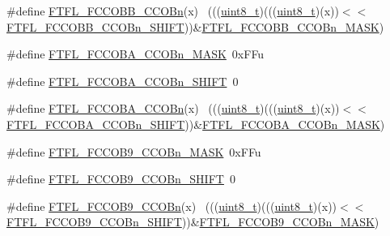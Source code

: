 \begin{DoxyCompactItemize}
\item 
\#define \hyperlink{group___f_t_f_l___register___masks_ga8c8c060a2b2c08932c0e1b086c0c7d60}{F\+T\+F\+L\+\_\+\+F\+C\+C\+O\+B\+B\+\_\+\+C\+C\+O\+Bn}(x)                                      ~(((\hyperlink{_p_e___types_8h_aba7bc1797add20fe3efdf37ced1182c5}{uint8\+\_\+t})(((\hyperlink{_p_e___types_8h_aba7bc1797add20fe3efdf37ced1182c5}{uint8\+\_\+t})(x))$<$$<$\hyperlink{group___f_t_f_l___register___masks_ga067fddda40a93b82c28ccc4ce3a953bd}{F\+T\+F\+L\+\_\+\+F\+C\+C\+O\+B\+B\+\_\+\+C\+C\+O\+Bn\+\_\+\+S\+H\+I\+FT}))\&\hyperlink{group___f_t_f_l___register___masks_ga00aef335772d6ebee4d1e0fbeda40c7d}{F\+T\+F\+L\+\_\+\+F\+C\+C\+O\+B\+B\+\_\+\+C\+C\+O\+Bn\+\_\+\+M\+A\+SK})
\item 
\#define \hyperlink{group___f_t_f_l___register___masks_ga990729a695abb380c9cc804f68ec67b5}{F\+T\+F\+L\+\_\+\+F\+C\+C\+O\+B\+A\+\_\+\+C\+C\+O\+Bn\+\_\+\+M\+A\+SK}~0x\+F\+Fu
\item 
\#define \hyperlink{group___f_t_f_l___register___masks_gaa02cc5a818b780fca7bbfd8755ff6edd}{F\+T\+F\+L\+\_\+\+F\+C\+C\+O\+B\+A\+\_\+\+C\+C\+O\+Bn\+\_\+\+S\+H\+I\+FT}~0
\item 
\#define \hyperlink{group___f_t_f_l___register___masks_ga41d45da82803e80c3faaee17a5a120be}{F\+T\+F\+L\+\_\+\+F\+C\+C\+O\+B\+A\+\_\+\+C\+C\+O\+Bn}(x)                                      ~(((\hyperlink{_p_e___types_8h_aba7bc1797add20fe3efdf37ced1182c5}{uint8\+\_\+t})(((\hyperlink{_p_e___types_8h_aba7bc1797add20fe3efdf37ced1182c5}{uint8\+\_\+t})(x))$<$$<$\hyperlink{group___f_t_f_l___register___masks_gaa02cc5a818b780fca7bbfd8755ff6edd}{F\+T\+F\+L\+\_\+\+F\+C\+C\+O\+B\+A\+\_\+\+C\+C\+O\+Bn\+\_\+\+S\+H\+I\+FT}))\&\hyperlink{group___f_t_f_l___register___masks_ga990729a695abb380c9cc804f68ec67b5}{F\+T\+F\+L\+\_\+\+F\+C\+C\+O\+B\+A\+\_\+\+C\+C\+O\+Bn\+\_\+\+M\+A\+SK})
\item 
\#define \hyperlink{group___f_t_f_l___register___masks_ga121ed92b960f5290741c5826b214856c}{F\+T\+F\+L\+\_\+\+F\+C\+C\+O\+B9\+\_\+\+C\+C\+O\+Bn\+\_\+\+M\+A\+SK}~0x\+F\+Fu
\item 
\#define \hyperlink{group___f_t_f_l___register___masks_gafb904bba83e6b2a70c4e119378f2225f}{F\+T\+F\+L\+\_\+\+F\+C\+C\+O\+B9\+\_\+\+C\+C\+O\+Bn\+\_\+\+S\+H\+I\+FT}~0
\item 
\#define \hyperlink{group___f_t_f_l___register___masks_gadc280f275b2251d978f70847f2dde232}{F\+T\+F\+L\+\_\+\+F\+C\+C\+O\+B9\+\_\+\+C\+C\+O\+Bn}(x)                                      ~(((\hyperlink{_p_e___types_8h_aba7bc1797add20fe3efdf37ced1182c5}{uint8\+\_\+t})(((\hyperlink{_p_e___types_8h_aba7bc1797add20fe3efdf37ced1182c5}{uint8\+\_\+t})(x))$<$$<$\hyperlink{group___f_t_f_l___register___masks_gafb904bba83e6b2a70c4e119378f2225f}{F\+T\+F\+L\+\_\+\+F\+C\+C\+O\+B9\+\_\+\+C\+C\+O\+Bn\+\_\+\+S\+H\+I\+FT}))\&\hyperlink{group___f_t_f_l___register___masks_ga121ed92b960f5290741c5826b214856c}{F\+T\+F\+L\+\_\+\+F\+C\+C\+O\+B9\+\_\+\+C\+C\+O\+Bn\+\_\+\+M\+A\+SK})
$$
\end{DoxyCompactItemize}
